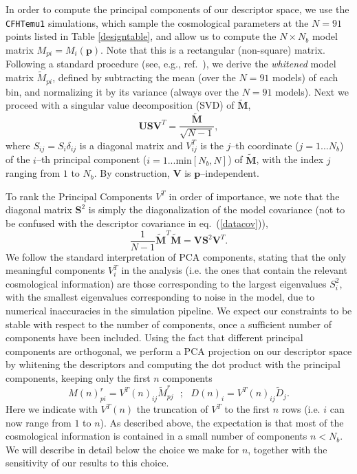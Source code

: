 \documentclass[reprint,aps,prd,superscriptaddress,showkeys,showpacs]{revtex4-1}
\begin{document}
In order to compute the principal components of our descriptor space,
we use the \texttt{CFHTemu1} simulations, which sample the
cosmological parameters at the $N=91$ points listed in Table
\ref{designtable}, and allow us to compute the $N\times N_b$ model
matrix $M_{pi}=M_i(\mathbf{p})$. Note that this is a rectangular
(non-square) matrix. Following a standard procedure (see, e.g.,
ref.~\citep{astroMLText}), we derive the {\it whitened} model matrix
$\tilde{M}_{pi}$, defined by subtracting the mean (over the $N=91$ models) of each bin,
and normalizing it by its variance (always over the $N=91$ models). Next we proceed with a singular
value decomposition (SVD) of $\mathbf{\tilde{M}}$,
\begin{equation}
\label{svd}
\mathbf{U}\mathbf{S} \mathbf{V}^T=\frac{\mathbf{\tilde{M}}}{\sqrt{N-1}},
\end{equation}   
where $S_{ij}=S_i\delta_{ij}$ is a diagonal matrix and $V^T_{ij}$ is
the $j$--th coordinate ($j=1...N_b$) of the $i$--th principal
component ($i=1...\mathrm{min}[N_b,N]$) of $\mathbf{\tilde{M}}$, with
the index $j$ ranging from $1$ to $N_b$. By construction,
$\mathbf{V}$ is $\mathbf{p}$--independent.

To rank the Principal Components $V^T$ in order of importance, we note
that the diagonal matrix $\mathbf{S}^2$ is simply the diagonalization
of the model covariance (not to be confused with the descriptor
covariance in eq.~(\ref{datacov})),
\begin{equation}
\frac{1}{N-1}\mathbf{\tilde{M}}^T\mathbf{\tilde{M}} = \mathbf{V}\mathbf{S}^2\mathbf{V}^T.
\end{equation} 
We follow the standard interpretation of PCA components, stating that
the only meaningful components $V^T_i$ in the analysis (i.e. the ones
that contain the relevant cosmological information) are those
corresponding to the largest eigenvalues $S^2_{i}$, with the smallest
eigenvalues corresponding to noise in the model, due to numerical
inaccuracies in the simulation pipeline. We expect our constraints to
be stable with respect to the number of components, once a sufficient
number of components have been included. Using the fact that different
principal components are orthogonal, we perform a PCA projection on
our descriptor space by whitening the descriptors and computing the
dot product with the principal components, keeping only the first $n$
components
\begin{equation}
\label{pcaprojection}
M(n)_{pi}^r = V^T(n)_{ij}\tilde{M}_{pj}^r \,\,\,\, ; \,\,\,\,  D(n)_i = V^T(n)_{ij}\tilde{D}_j.
\end{equation}
Here we indicate with $V^T(n)$ the truncation of $V^T$ to the first $n$
rows (i.e. $i$ can now range from $1$ to $n$). As described above, the
expectation is that most of the cosmological information is contained
in a small number of components $n<N_{b}$. We will describe in detail
below the choice we make for $n$, together with the sensitivity of our
results to this choice.
\end{document}
